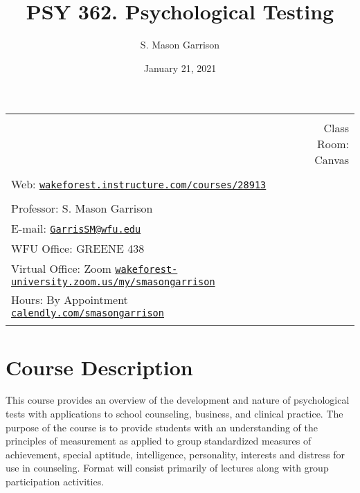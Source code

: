 \documentclass[11pt,]{article}
\title{PSY 362. Psychological Testing}
\author{S. Mason Garrison}
\date{January 21, 2021}
\begin{document}
		\maketitle
	

		\thispagestyle{firststyle}



\noindent \begin{tabular*}{\textwidth}{ @{\extracolsep{\fill}} lr @{\extracolsep{\fill}}}
\hline\\
    &  Class Room: Canvas
%
\\\hline\\
%
 Web: \href{https://wakeforest.instructure.com/courses/28913}{\tt wakeforest.instructure.com/courses/28913}&  \\ %
&  \\
Professor: S. Mason Garrison \\

E-mail: \texttt{\href{mailto:GarrisSM@wfu.edu}{\nolinkurl{GarrisSM@wfu.edu}}}  \\

WFU Office: GREENE 438   \\
Virtual Office: Zoom
\href{https://wakeforest-university.zoom.us/my/smasongarrison}{\tiny\tt wakeforest-university.zoom.us/my/smasongarrison}   \\
Hours: By Appointment
\href{https://calendly.com/smasongarrison/}{\small\tt calendly.com/smasongarrison}  \\


	&  \\
	\hline
\end{tabular*}

\vspace{2mm}

\hypertarget{course-description}{%
\section{Course Description}\label{course-description}}

This course provides an overview of the development and nature of
psychological tests with applications to school counseling, business,
and clinical practice. The purpose of the course is to provide students
with an understanding of the principles of measurement as applied to
group standardized measures of achievement, special aptitude,
intelligence, personality, interests and distress for use in counseling.
Format will consist primarily of lectures along with group participation
activities.
\end{document}
